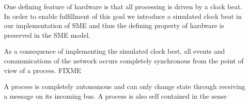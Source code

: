 


\begin{property} One defining feature of
    hardware is that all processing is driven by a clock beat. In
    order to enable fulfillment of this goal we introduce a simulated
    clock beat in our implementation of SME and thus the defining
    property of hardware is preserved in the SME model.
\end{property}

\begin{property}
  \label{synchro}
  As a consequence of implementing the simulated clock best, all
  events and communications of the network occurs completely
  synchronous from the point of view of a process. FIXME
\end{property}

\begin{property}
  \label{noshare}
  A process is completely autonomous and can only change state through
  receiving a message on its incoming bus. A process is also self
  contained in the sense
\end{property}

